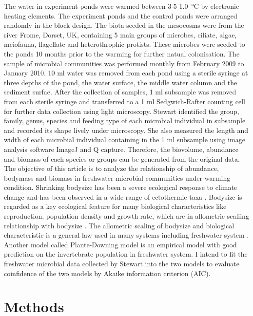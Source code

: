 \documentclass[11pt]{article}
\begin{document}
\begin{linenumbers}
The water in experiment ponds were warmed between 3-5 \SI{1.0}{\celsius} by electronic heating elements.
The experiment ponds and the control ponds were arranged randomly in the block design.
The biota seeded in the mesocosms were from the river Frome, Dorset, UK, containing 5 main groups of microbes, ciliate, algae, meiofauna, flagellate and heterothrophic protists.
These microbes were seeded to the ponds 10 months prior to the warming for further natual colonisation. The sample of microbial communities was performed monthly from February 2009 to January 2010.
10 ml water was removed from each pond using a sterile syringe at three depths of the pond, the water surface, the middle water column and the sediment surfae.
After the collection of samples, 1 ml subsample was removed from each sterile syringe and transferred to a 1 ml Sedgwich-Rafter counting cell for further data collection using light microscopy.
Stewart identified the group, family, genus, species and feeding type of each microbial individual in subsample and recorded its shape lively under microscopy.
She also measured the length and width of each microbial individual containing in the 1 ml subsample using image analysis software ImageJ and Q capture.
Therefore, the biovolume, abundance and biomass of each species or groups can be generated from the original data. \\
The objective of this article is to analyze the relationship of abundance, bodymass and biomass in freshwater microbial communities under warming condition.
Shrinking bodysize has been a severe ecological response to climate change and has been observed in a wide range of ectothermic taxa \cite{walters2006temperature}.
Bodysize is regarded as a key ecological feature for many biological characteristics  like reproduction, population density and growth rate, which are in allometric scaliing relationship with bodysize \cite{peters1983effect}.
The allometric scaling of bodysize and biological characteristic is a general law used in many systems including freshwater system \cite{yvon2011warming}.
Another model called Plante-Downing model is an empirical model with good prediction on the invertebrate population in freshwater system\cite{plante1989production}.
I intend to fit the freshwater microbial data collected by Stewart into the two models to evaluate coinfidence of the two models by Akaike information criterion (AIC).

\section*{Methods}

\end{linenumbers}
\end{document}
